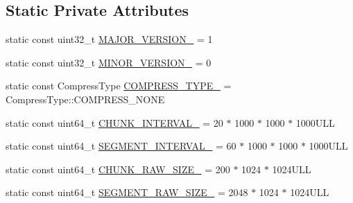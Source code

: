 \subsection*{Static Private Attributes}
\begin{DoxyCompactItemize}
\item 
static const uint32\-\_\-t \hyperlink{classapollo_1_1cyber_1_1record_1_1HeaderBuilder_a03b1010861ba604c86b9492e31defdc3}{M\-A\-J\-O\-R\-\_\-\-V\-E\-R\-S\-I\-O\-N\-\_\-} = 1
\item 
static const uint32\-\_\-t \hyperlink{classapollo_1_1cyber_1_1record_1_1HeaderBuilder_ac6d71c6ce128e1a440381bc3c7b017b7}{M\-I\-N\-O\-R\-\_\-\-V\-E\-R\-S\-I\-O\-N\-\_\-} = 0
\item 
static const Compress\-Type \hyperlink{classapollo_1_1cyber_1_1record_1_1HeaderBuilder_aa639687fc14644cdccb36dc57bbf2bf2}{C\-O\-M\-P\-R\-E\-S\-S\-\_\-\-T\-Y\-P\-E\-\_\-} = Compress\-Type\-::\-C\-O\-M\-P\-R\-E\-S\-S\-\_\-\-N\-O\-N\-E
\item 
static const uint64\-\_\-t \hyperlink{classapollo_1_1cyber_1_1record_1_1HeaderBuilder_ab38d31ea9629861522bf37f9d9f6c33b}{C\-H\-U\-N\-K\-\_\-\-I\-N\-T\-E\-R\-V\-A\-L\-\_\-} = 20 $\ast$ 1000 $\ast$ 1000 $\ast$ 1000\-U\-L\-L
\item 
static const uint64\-\_\-t \hyperlink{classapollo_1_1cyber_1_1record_1_1HeaderBuilder_a22f9572d9b028a576078790a7745cf74}{S\-E\-G\-M\-E\-N\-T\-\_\-\-I\-N\-T\-E\-R\-V\-A\-L\-\_\-} = 60 $\ast$ 1000 $\ast$ 1000 $\ast$ 1000\-U\-L\-L
\item 
static const uint64\-\_\-t \hyperlink{classapollo_1_1cyber_1_1record_1_1HeaderBuilder_ac362989d14c7dac1a3ac2999e1995422}{C\-H\-U\-N\-K\-\_\-\-R\-A\-W\-\_\-\-S\-I\-Z\-E\-\_\-} = 200 $\ast$ 1024 $\ast$ 1024\-U\-L\-L
\item 
static const uint64\-\_\-t \hyperlink{classapollo_1_1cyber_1_1record_1_1HeaderBuilder_acdaee20ce6f5c6227aefa2f09ec14f15}{S\-E\-G\-M\-E\-N\-T\-\_\-\-R\-A\-W\-\_\-\-S\-I\-Z\-E\-\_\-} = 2048 $\ast$ 1024 $\ast$ 1024\-U\-L\-L
\end{DoxyCompactItemize}


